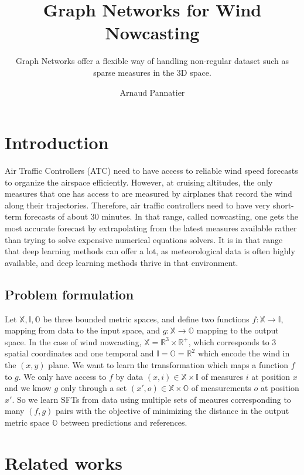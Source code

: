 \documentclass[a4paper,10pt]{article}
\title{Graph Networks for Wind Nowcasting}
\subtitle{ Graph Networks offer a flexible way of handling non-regular dataset such as sparse measures in the 3D space.}
\author{Arnaud Pannatier}
\begin{document}
\maketitle

\section{Introduction}
Air Traffic Controllers (ATC) need to have access to reliable wind speed forecasts to organize the airspace efficiently.
However, at cruising altitudes, the only measures that one has access to are measured by airplanes that record the wind along their trajectories.
Therefore, air traffic controllers need to have very short-term forecasts of about 30 minutes.
In that range, called nowcasting, one gets the most accurate forecast by extrapolating from the latest measures available rather than trying to solve expensive numerical equations solvers.
It is in that range that deep learning methods can offer a lot, as meteorological data is often highly available, and deep learning methods thrive in that environment.

\subsection{Problem formulation}

Let $\mathbb{X}, \mathbb{I}, \mathbb{O}$ be three bounded metric spaces, and define two functions $f : \mathbb{X}\rightarrow \mathbb{I}$, mapping from data to the input space, and $g : \mathbb{X}\rightarrow \mathbb{O}$ mapping to the output space.
In the case of wind nowcasting, $\mathbb{X} = \mathbb{R}^{3} \times \mathbb{R}^{+}$, which corresponds to 3 spatial coordinates and one temporal and $\mathbb{I} = \mathbb{O} = \mathbb{R}^{2}$ which encode the wind in the $(x,y)$ plane.
We want to learn the transformation which maps a function $f$ to $g$.
We only have access to $f$ by data $(x, i)  \in \mathbb{X} \times \mathbb{I}$ of measures $i$ at position $x$ and we know $g$ only through a set $(x', o) \in \mathbb{X} \times \mathbb{O}$ of measurements $o$ at position $x'$.
So we learn SFTs from data using multiple sets of meaures corresponding to many $(f,g)$ pairs with the objective of minimizing the distance in the output metric space $\mathbb{O}$ between predictions and references.

\section{Related works}
\end{document}
